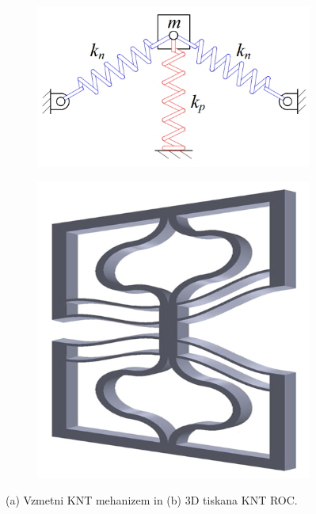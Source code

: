     \begin{figure}[!htb]
        \centering
        \begin{subfigure}{.4\textwidth}
            \centering
            \includegraphics[trim=0 0 -2cm 0, clip, width=\linewidth]{Magisterski praktikum/slike/teorija/vzmetna_KNT_ROC.png}
            \caption{}
            \label{fig:vzmetna_KNT_ROC}
        \end{subfigure}%
        \begin{subfigure}{.3\textwidth}
            \centering
            \includegraphics[trim=-5cm 0 0 0, clip, width=\linewidth]{Magisterski praktikum/slike/teorija/3D tiskana_KNT_ROC.png}
            \caption{}
            \label{fig:3D tiskana_KNT_ROC}
        \end{subfigure}%
        \caption{(a) Vzmetni KNT mehanizem in (b) 3D tiskana KNT ROC.}
    \end{figure}
    
